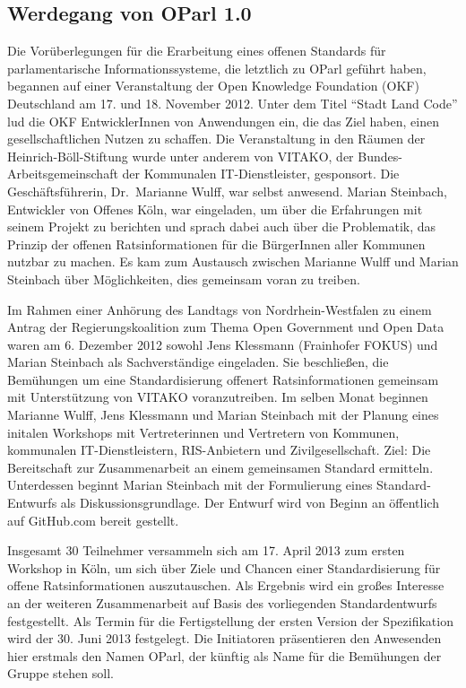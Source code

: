 \documentclass[,a4paper]{article}
\begin{document}
\subsection{Werdegang von OParl 1.0}\label{werdegang-von-oparl-1.0}

Die Vorüberlegungen für die Erarbeitung eines offenen Standards für
parlamentarische Informationssysteme, die letztlich zu OParl geführt
haben, begannen auf einer Veranstaltung der Open Knowledge Foundation
(OKF) Deutschland am 17. und 18. November 2012. Unter dem Titel ``Stadt
Land Code'' lud die OKF EntwicklerInnen von Anwendungen ein, die das
Ziel haben, einen gesellschaftlichen Nutzen zu schaffen. Die
Veranstaltung in den Räumen der Heinrich-Böll-Stiftung wurde unter
anderem von VITAKO, der Bundes-Arbeitsgemeinschaft der Kommunalen
IT-Dienstleister, gesponsort. Die Geschäftsführerin, Dr.~Marianne Wulff,
war selbst anwesend. Marian Steinbach, Entwickler von Offenes Köln, war
eingeladen, um über die Erfahrungen mit seinem Projekt zu berichten und
sprach dabei auch über die Problematik, das Prinzip der offenen
Ratsinformationen für die BürgerInnen aller Kommunen nutzbar zu machen.
Es kam zum Austausch zwischen Marianne Wulff und Marian Steinbach über
Möglichkeiten, dies gemeinsam voran zu treiben.

Im Rahmen einer Anhörung des Landtags von Nordrhein-Westfalen zu einem
Antrag der Regierungskoalition zum Thema Open Government und Open Data
waren am 6. Dezember 2012 sowohl Jens Klessmann (Frainhofer FOKUS) und
Marian Steinbach als Sachverständige eingeladen. Sie beschließen, die
Bemühungen um eine Standardisierung offenert Ratsinformationen gemeinsam
mit Unterstützung von VITAKO voranzutreiben. Im selben Monat beginnen
Marianne Wulff, Jens Klessmann und Marian Steinbach mit der Planung
eines initalen Workshops mit Vertreterinnen und Vertretern von Kommunen,
kommunalen IT-Dienstleistern, RIS-Anbietern und Zivilgesellschaft. Ziel:
Die Bereitschaft zur Zusammenarbeit an einem gemeinsamen Standard
ermitteln. Unterdessen beginnt Marian Steinbach mit der Formulierung
eines Standard-Entwurfs als Diskussionsgrundlage. Der Entwurf wird von
Beginn an öffentlich auf GitHub.com bereit gestellt.

Insgesamt 30 Teilnehmer versammeln sich am 17. April 2013 zum ersten
Workshop in Köln, um sich über Ziele und Chancen einer Standardisierung
für offene Ratsinformationen auszutauschen. Als Ergebnis wird ein großes
Interesse an der weiteren Zusammenarbeit auf Basis des vorliegenden
Standardentwurfs festgestellt. Als Termin für die Fertigstellung der
ersten Version der Spezifikation wird der 30. Juni 2013 festgelegt. Die
Initiatoren präsentieren den Anwesenden hier erstmals den Namen OParl,
der künftig als Name für die Bemühungen der Gruppe stehen soll.
\end{document}
